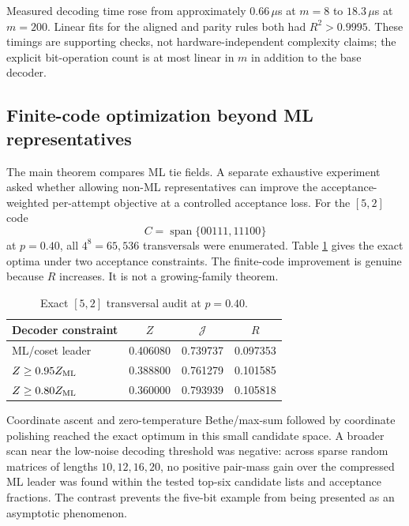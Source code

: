 \documentclass[journal]{IEEEtran}
\theoremstyle{definition}
\theoremstyle{remark}
\begin{document}
Measured decoding time rose from approximately $0.66\,\mu$s at $m=8$ to
$18.3\,\mu$s at $m=200$.  Linear fits for the aligned and parity rules both
had $R^2>0.9995$.  These timings are supporting checks, not hardware-independent
complexity claims; the explicit bit-operation count is at most linear in $m$
in addition to the base decoder.

\subsection{Finite-code optimization beyond ML representatives}

The main theorem compares ML tie fields.  A separate exhaustive experiment
asked whether allowing non-ML representatives can improve the
acceptance-weighted per-attempt objective at a controlled acceptance loss.  For
the $[5,2]$ code
\begin{equation}
 C=\operatorname{span}\{00111,11100\}
 \label{eq:five-code}
\end{equation}
at $p=0.40$, all $4^8=65{,}536$ transversals were enumerated.  Table
\ref{tab:five-code} gives the exact optima under two acceptance constraints.
The finite-code improvement is genuine because $R$ increases.  It is not a
growing-family theorem.

\begin{table}[t]
\centering
\caption{Exact $[5,2]$ transversal audit at $p=0.40$.}
\label{tab:five-code}
\begin{tabular}{@{}lccc@{}}
\toprule
Decoder constraint & $Z$ & $\mathcal J$ & $R$\\
\midrule
ML/coset leader & 0.406080 & 0.739737 & 0.097353\\
$Z\ge0.95Z_{\rm ML}$ & 0.388800 & 0.761279 & 0.101585\\
$Z\ge0.80Z_{\rm ML}$ & 0.360000 & 0.793939 & 0.105818\\
\bottomrule
\end{tabular}
\end{table}

Coordinate ascent and zero-temperature Bethe/max-sum followed by coordinate
polishing reached the exact optimum in this small candidate space.  A broader
scan near the low-noise decoding threshold was negative: across sparse random
matrices of lengths $10,12,16,20$, no positive pair-mass gain over the
compressed ML leader was found within the tested top-six candidate lists and
acceptance fractions.  The contrast prevents the five-bit example from being
presented as an asymptotic phenomenon.
\end{document}

